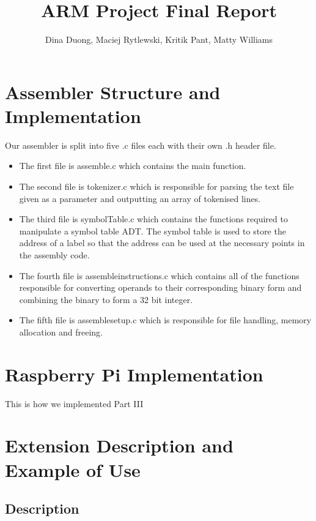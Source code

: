 \documentclass[11pt]{article}
\begin{document}
\title{
    \vspace{-2cm}
    ARM Project Final Report}
\author{Dina Duong, Maciej Rytlewski, Kritik Pant, Matty Williams}

\maketitle

\section{Assembler Structure and Implementation}

Our assembler is split into five .c files each with their own .h header file.

\begin{itemize}
    \item The first file is assemble.c which contains the main function.
    \item The second file is tokenizer.c which is responsible for parsing the text file given as a parameter and outputting an array of tokenised lines.
    \item The third file is symbolTable.c which contains the functions required to manipulate a symbol table ADT. The symbol table is used to store the address of a label so that the address can be used at the necessary points in the assembly code.
    \item The fourth file is assembleinstructions.c which contains all of the functions responsible for converting operands to their corresponding binary form and combining the binary to form a 32 bit integer.
    \item The fifth file is assemblesetup.c which is responsible for file handling, memory allocation and freeing. 
\end{itemize}

\section{Raspberry Pi Implementation}

This is how we implemented Part III

\section{Extension Description and Example of Use}

\subsection{Description}
\end{document}
